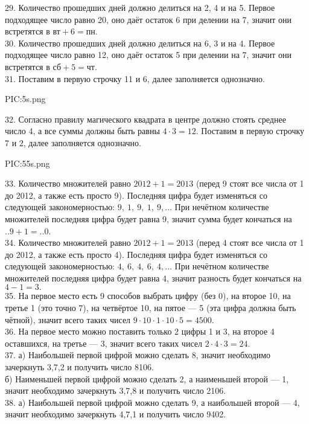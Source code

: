 29. Количество прошедших дней должно делиться на 2, 4 и на 5. Первое подходящее число равно 20, оно даёт остаток 6 при делении на 7, значит они встретятся в $\text{вт}+6=\text{пн}$.\\
30. Количество прошедших дней должно делиться на 6, 3 и на 4. Первое подходящее число равно 12, оно даёт остаток 5 при делении на 7, значит они встретятся в $\text{сб}+5=\text{чт}$.\\
31. Поставим в первую строчку 11 и 6, далее заполняется однозначно.
\begin{center}
{{PIC:5s.png}}
\end{center}
32. Согласно правилу магического квадрата в центре должно стоять среднее число 4, а все суммы должны быть равны $4\cdot3=12.$ Поставим в первую строчку 7 и 2, далее заполняется однозначно.
\begin{center}
{{PIC:55s.png}}
\end{center}
33. Количество множителей равно $2012+1=2013$ (перед 9 стоят все числа от 1 до 2012, а также есть просто 9). Последняя цифра будет изменяться со следующей закономерностью: $9,\ 1,\ 9,\ 1,\ 9,\ldots$ При нечётном количестве множителей последняя цифра будет равна 9, значит сумма будет кончаться на $..9+1=..0$.\\
34. Количество множителей равно $2012+1=2013$ (перед 4 стоят все числа от 1 до 2012, а также есть просто 4). Последняя цифра будет изменяться со следующей закономерностью: $4,\ 6,\ 4,\ 6,\ 4,\ldots$ При нечётном количестве множителей последняя цифра будет равна 4, значит разность будет кончаться на $4-1=3.$\\
35. На первое место есть 9 способов выбрать цифру (без 0), на второе 10, на третье 1 (это точно 7), на четвёртое 10, на пятое --- 5 (эта цифра должна быть чётной), значит всего таких чисел $9\cdot10\cdot1\cdot10\cdot5=4500.$\\
36. На первое место можно поставить только 2 цифры 1 и 3, на второе 4 оставшихся, на третье --- 3, значит всего таких чисел $2\cdot4\cdot3=24.$\\
37. а) Наибольшей первой цифрой можно сделать 8, значит необходимо зачеркнуть 3,7,2 и получить число 8106.\\
б) Наименьшей первой цифрой можно сделать 2, а наименьшей второй --- 1, значит необходимо зачеркнуть 3,7,8 и получить число 2106.\\
38. а) Наибольшей первой цифрой можно сделать 9, а наибольшей второй --- 4, значит необходимо зачеркнуть 4,7,1 и получить число 9402.\\
